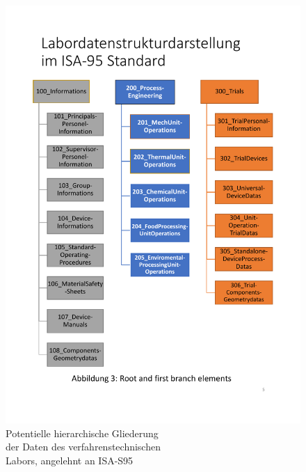 \documentclass[
fontsize=12pt, 
paper=a4, 
 BCOR=10mm, 
twoside=false,
DIV=25 
usegeometry%
]{scrartcl}
\begin{document}
\begin{figure}[p!] %
\centering
\includegraphics[width=1\textwidth]{Bilder/DB/Labordatenstrukturdarstellung_im_ISA-95 Standard.pdf}
 \caption[Hierarchische Darstellung der Labordaten, angelehnt an ISA-S95]
 {Potentielle hierarchische Gliederung\\ der Daten des  verfahrenstechnischen\\ Labors, angelehnt an ISA-S95}\label{fig:hierarchisch_vt}
\end{figure}
\end{document}
